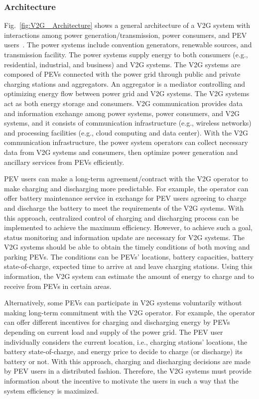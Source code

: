 \documentclass[twocolumn,10pt]{IEEEtran}
\begin{document}
\subsubsection{Architecture}

Fig.~\ref{fig:V2G _Architecture} shows a general architecture of a V2G system with interactions among power generation/transmission, power consumers, and PEV users~\cite{Guille2009A conceptual}. The power systems include convention generators, renewable sources, and transmission facility. The power systems supply energy to both consumers (e.g., residential, industrial, and business) and V2G systems. The V2G systems are composed of PEVs connected with the power grid through public and private charging stations and aggregators. An aggregator is a mediator controlling and optimizing energy flow between power grid and V2G systems. The V2G systems act as both energy storage and consumers. V2G communication provides data and information exchange among power systems, power consumers, and V2G systems, and it consists of communication infrastructure (e.g., wireless networks) and processing facilities (e.g., cloud computing and data center). With the V2G communication infrastructure, the power system operators can collect necessary data from V2G systems and consumers, then optimize power generation and ancillary services from PEVs efficiently.

PEV users can make a long-term agreement/contract with the V2G operator to make charging and discharging more predictable. For example, the operator can offer battery maintenance service in exchange for PEV users agreeing to charge and discharge the battery to meet the requirements of the V2G systems. With this approach, centralized control of charging and discharging process can be implemented to achieve the maximum efficiency. However, to achieve such a goal, status monitoring and information update are necessary for V2G systems. The V2G systems should be able to obtain the timely conditions of both moving and parking PEVs. The conditions can be PEVs' locations, battery capacities, battery state-of-charge, expected time to arrive at and leave charging stations. Using this information, the V2G system can estimate the amount of energy to charge and to receive from PEVs in certain areas.

Alternatively, some PEVs can participate in V2G systems voluntarily without making long-term commitment with the V2G operator. For example, the operator can offer different incentives for charging and discharging energy by PEVs depending on current load and supply of the power grid. The PEV user individually considers the current location, i.e., charging stations' locations, the battery state-of-charge, and energy price to decide to charge (or discharge) its battery or not. With this approach, charging and discharging decisions are made by PEV users in a distributed fashion. Therefore, the V2G systems must provide information about the incentive to motivate the users in such a way that the system efficiency is maximized.
\end{document}
